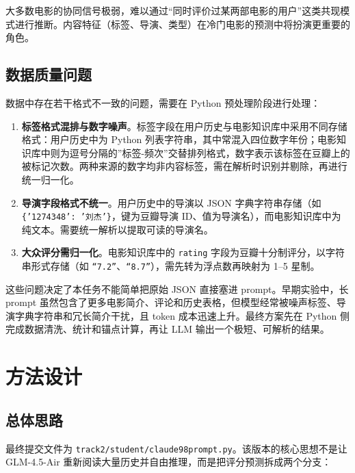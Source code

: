 \documentclass[UTF8,a4paper,10pt,fontset=none]{ctexart}
\begin{document}
大多数电影的协同信号极弱，难以通过“同时评价过某两部电影的用户”这类共现模式进行推断。内容特征（标签、导演、类型）在冷门电影的预测中将扮演更重要的角色。

\subsection{数据质量问题}

数据中存在若干格式不一致的问题，需要在 Python 预处理阶段进行处理：

\begin{enumerate}
    \item \textbf{标签格式混排与数字噪声}。标签字段在用户历史与电影知识库中采用不同存储格式：用户历史中为 Python 列表字符串，其中常混入四位数字年份；电影知识库中则为逗号分隔的”标签-频次”交替排列格式，数字表示该标签在豆瓣上的被标记次数。两种来源的数字均非内容标签，需在解析时识别并剔除，再进行统一归一化。

    \item \textbf{导演字段格式不统一}。用户历史中的导演以 JSON 字典字符串存储（如 \texttt{\{'1274348': '刘杰'\}}，键为豆瓣导演 ID、值为导演名），而电影知识库中为纯文本。需要统一解析以提取可读的导演名。

    \item \textbf{大众评分需归一化}。电影知识库中的 \texttt{rating} 字段为豆瓣十分制评分，以字符串形式存储（如 \texttt{“7.2”}、\texttt{“8.7”}），需先转为浮点数再映射为 1--5 星制。
\end{enumerate}

这些问题决定了本任务不能简单把原始 JSON 直接塞进 prompt。早期实验中，长 prompt 虽然包含了更多电影简介、评论和历史表格，但模型经常被噪声标签、导演字典字符串和冗长简介干扰，且 token 成本迅速上升。最终方案先在 Python 侧完成数据清洗、统计和锚点计算，再让 LLM 输出一个极短、可解析的结果。

\section{方法设计}

\subsection{总体思路}

最终提交文件为 \texttt{track2/student/claude98prompt.py}。该版本的核心思想不是让 GLM-4.5-Air 重新阅读大量历史并自由推理，而是把评分预测拆成两个分支：
\end{document}
